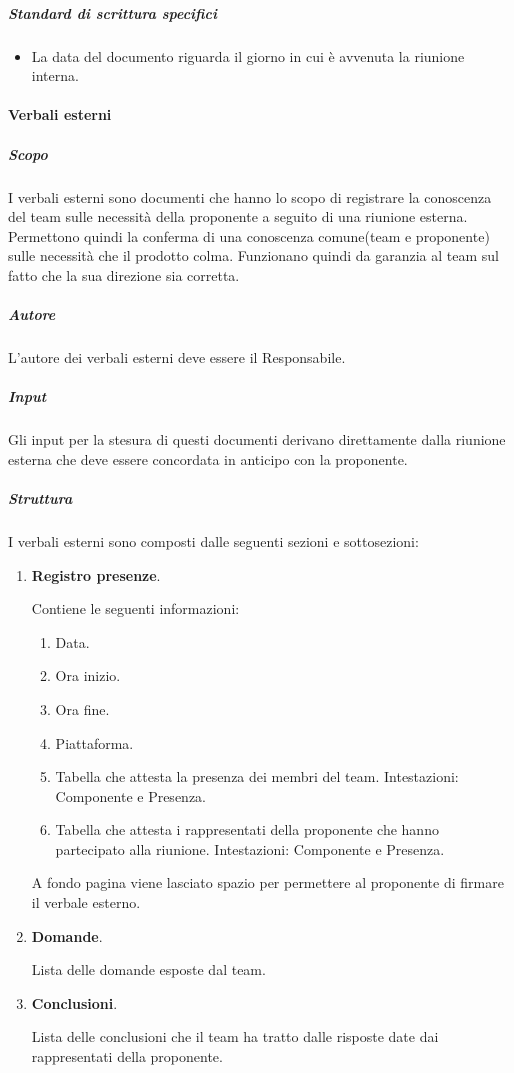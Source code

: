 \subparagraph{Standard di scrittura specifici}
\begin{itemize}
    \item La data del documento riguarda il giorno in cui è avvenuta la riunione interna.
\end{itemize}

\paragraph{Verbali esterni}

\subparagraph{Scopo}
I verbali esterni sono documenti che hanno lo scopo di registrare la conoscenza del team sulle necessità della proponente a seguito di una riunione esterna.
Permettono quindi la conferma di una conoscenza comune(team e proponente) sulle necessità che il prodotto colma.
Funzionano quindi da garanzia al team sul fatto che la sua direzione sia corretta.

\subparagraph{Autore}
L'autore dei verbali esterni deve essere il Responsabile.

\subparagraph{Input}
Gli input per la stesura di questi documenti derivano direttamente dalla riunione esterna che deve essere concordata in anticipo con la proponente.

\subparagraph{Struttura}
I verbali esterni sono composti dalle seguenti sezioni e sottosezioni:
\begin{enumerate}
    \item \textbf{Registro presenze}.
    
    Contiene le seguenti informazioni:
    \begin{enumerate}
        \item Data.
        \item Ora inizio.
        \item Ora fine.
        \item Piattaforma.
        \item Tabella che attesta la presenza dei membri del team.
        Intestazioni: Componente e Presenza.
        \item Tabella che attesta i rappresentati della proponente che hanno partecipato alla riunione.
        Intestazioni: Componente e Presenza.
    \end{enumerate}
    A fondo pagina viene lasciato spazio per permettere al proponente di firmare il verbale esterno.

    \item \textbf{Domande}.
    
    Lista delle domande esposte dal team.

    \item \textbf{Conclusioni}.
    
    Lista delle conclusioni che il team ha tratto dalle risposte date dai rappresentati della proponente.
\end{enumerate}

